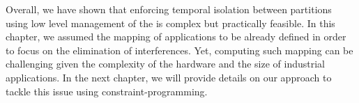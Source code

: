 \documentclass[main.tex]{subfiles}
\begin{document}
Overall, we have shown that enforcing temporal isolation between partitions
using low level management of the \mppalong is complex but practically
feasible. In this chapter, we assumed the mapping of applications to be already
defined in order to focus on the elimination of interferences. Yet, computing
such mapping can be challenging given the complexity of the hardware and the
size of industrial applications. In the next chapter, we will provide details
on our approach to tackle this issue using constraint-programming.

\clearpage
\subbiblio
\end{document}
